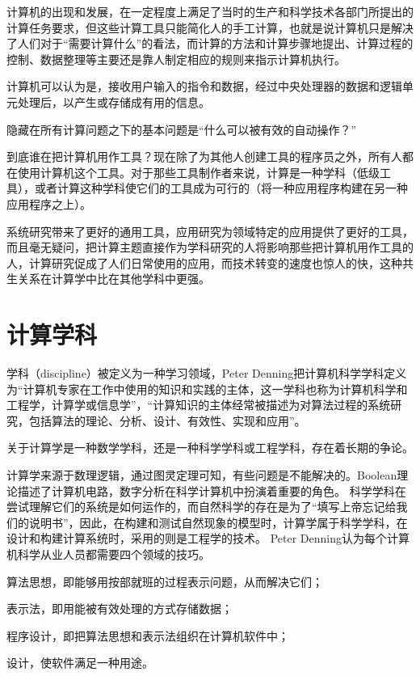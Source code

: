 计算机的出现和发展，在一定程度上满足了当时的生产和科学技术各部门所提出的计算任务要求，但这些计算工具只能简化人的手工计算，也就是说计算机只是解决了人们对于“需要计算什么”的看法，而计算的方法和计算步骤地提出、计算过程的控制、数据整理等主要还是靠人制定相应的规则来指示计算机执行。

计算机可以认为是，接收用户输入的指令和数据，经过中央处理器的数据和逻辑单元处理后，以产生或存储成有用的信息。


隐藏在所有计算问题之下的基本问题是“什么可以被有效的自动操作？”

到底谁在把计算机用作工具？现在除了为其他人创建工具的程序员之外，所有人都在使用计算机这个工具。对于那些工具制作者来说，计算是一种学科（低级工具），或者计算这种学科使它们的工具成为可行的（将一种应用程序构建在另一种应用程序之上）。

系统研究带来了更好的通用工具，应用研究为领域特定的应用提供了更好的工具，而且毫无疑问，把计算主题直接作为学科研究的人将影响那些把计算机用作工具的人，计算研究促成了人们日常使用的应用，而技术转变的速度也惊人的快，这种共生关系在计算学中比在其他学科中更强。

\chapter{计算学科}

学科（discipline）被定义为一种学习领域，Peter Denning把计算机科学学科定义为“计算机专家在工作中使用的知识和实践的主体，这一学科也称为计算机科学和工程学，计算学或信息学”，“计算知识的主体经常被描述为对算法过程的系统研究，包括算法的理论、分析、设计、有效性、实现和应用”。

关于计算学是一种数学学科，还是一种科学学科或工程学科，存在着长期的争论。

计算学来源于数理逻辑，通过图灵定理可知，有些问题是不能解决的。Boolean理论描述了计算机电路，数字分析在科学计算机中扮演着重要的角色。
科学学科在尝试理解它们的系统是如何运作的，而自然科学的存在是为了“填写上帝忘记给我们的说明书”，因此，在构建和测试自然现象的模型时，计算学属于科学学科，在设计和构建计算系统时，采用的则是工程学的技术。
Peter Denning认为每个计算机科学从业人员都需要四个领域的技巧。

\begin{compactitem}
\item 算法思想，即能够用按部就班的过程表示问题，从而解决它们；
\item 表示法，即用能被有效处理的方式存储数据；
\item 程序设计，即把算法思想和表示法组织在计算机软件中；
\item 设计，使软件满足一种用途。
\end{compactitem}

